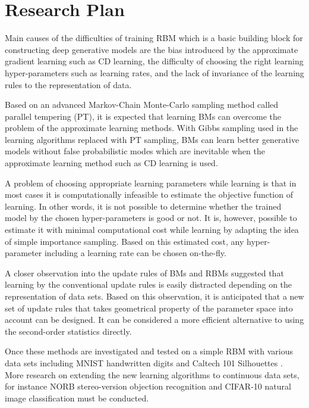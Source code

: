 \documentclass[11pt, oneside]{essay}
\begin{document}
\section{Research Plan}

Main causes of the difficulties of training RBM which is a
basic building block for constructing deep generative models
are the bias introduced by the approximate gradient learning
such as CD learning, the difficulty of choosing the right
learning hyper-parameters such as learning rates, and the
lack of invariance of the learning rules to the
representation of data.

Based on an advanced Markov-Chain Monte-Carlo sampling
method called parallel tempering (PT), it is expected that
learning BMs can overcome the problem of the approximate
learning methods. With Gibbs sampling used in the learning
algorithms replaced with PT sampling, BMs can learn better
generative models without false probabilistic modes which
are inevitable when the approximate learning method such as
CD learning is used.

A problem of choosing appropriate learning parameters while
learning is that in most cases it is computationally
infeasible to estimate the objective function of learning.
In other words, it is not possible to determine whether the
trained model by the chosen hyper-parameters is good or not.
It is, however, possible to estimate it with minimal
computational cost while learning by adapting the idea of
simple importance sampling. Based on this estimated cost,
any hyper-parameter including a learning rate can be chosen
on-the-fly.

A closer observation into the update rules of BMs and RBMs
suggested that learning by the conventional update rules is
easily distracted depending on the representation of data
sets. Based on this observation, it is anticipated that a
new set of update rules that takes geometrical property of
the parameter space into account can be designed. It can be
considered a more efficient alternative to using the
second-order statistics directly.

Once these methods are investigated and tested on a simple
RBM with various data sets including MNIST handwritten
digits \citep{Lecun1998} and Caltech 101 Silhouettes
\citep{Marlin2010}. More research on extending the
new learning algorithms to continuous data sets, for
instance NORB stereo-version objection recognition
\citep{Lecun2004} and CIFAR-10 natural image classification
\citep{Krizhevsky2009} must be
conducted.
\end{document}
